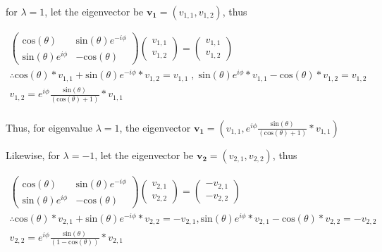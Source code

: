 \begin{alphaparts}
for $\lambda = 1$, let the eigenvector be $\mathbf{v_{1}} = (v_{1,1}, v_{1,2})$, thus 

\begin{gather*}
    \begin{pmatrix}
        \textrm{cos}(\theta) & \textrm{sin}(\theta)e^{-i\phi} \\
        \textrm{sin}(\theta)e^{i\phi} & -\textrm{cos}(\theta)
    \end{pmatrix}
    \begin{pmatrix}
        v_{1,1} \\
        v_{1,2}
    \end{pmatrix} = 
    \begin{pmatrix}
        v_{1,1} \\
        v_{1,2}
    \end{pmatrix} \\
    \therefore \textrm{cos}(\theta)*v_{1,1} + \textrm{sin}(\theta)e^{-i\phi}*v_{1,2} = v_{1,1} \; , \; \textrm{sin}(\theta)e^{i\phi}*v_{1,1} - \textrm{cos}(\theta)*v_{1,2} = v_{1,2} \\
    v_{1,2} = e^{i\phi}\frac{\textrm{sin}(\theta)}{(\textrm{cos}(\theta) + 1)}*v_{1,1} \\
\end{gather*}

Thus, for eigenvalue $\lambda = 1$, the eigenvector $\mathbf{v_{1}} = (v_{1,1}, e^{i\phi}\frac{\textrm{sin}(\theta)}{(\textrm{cos}(\theta) + 1)}*v_{1,1})$

Likewise, for $\lambda = -1$, let the eigenvector be $\mathbf{v_{2}} = (v_{2,1}, v_{2,2})$, thus

\begin{gather*}
    \begin{pmatrix}
        \textrm{cos}(\theta) & \textrm{sin}(\theta)e^{-i\phi} \\
        \textrm{sin}(\theta)e^{i\phi} & -\textrm{cos}(\theta)
    \end{pmatrix}
    \begin{pmatrix}
        v_{2,1} \\
        v_{2,2}
    \end{pmatrix} = 
    \begin{pmatrix}
        -v_{2,1} \\
        -v_{2,2}
    \end{pmatrix} \\
    \therefore \textrm{cos}(\theta)*v_{2,1} + \textrm{sin}(\theta)e^{-i\phi}*v_{2,2} = -v_{2,1}, \textrm{sin}(\theta)e^{i\phi}*v_{2,1} - \textrm{cos}(\theta)*v_{2,2} = -v_{2,2} \\
    v_{2,2} = e^{i\phi}\frac{\textrm{sin}(\theta)}{(1 - \textrm{cos}(\theta))}*v_{2,1} \\
\end{gather*}


\end{alphaparts}
